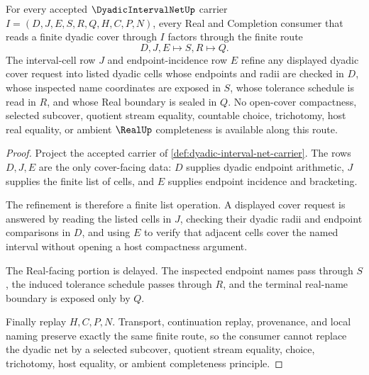 \begin{theorem}\label{thm:dyadic-interval-net-cover-refinement}
For every accepted $\DyadicIntervalNetUp$ carrier $I=(D,J,E,S,R,Q,H,C,P,N)$, every Real and Completion consumer that reads a finite dyadic cover through $I$ factors through the finite route
$$
D,J,E \longmapsto S,R \longmapsto Q .
$$
The interval-cell row $J$ and endpoint-incidence row $E$ refine any displayed dyadic cover request into listed dyadic cells whose endpoints and radii are checked in $D$, whose inspected name coordinates are exposed in $S$, whose tolerance schedule is read in $R$, and whose Real boundary is sealed in $Q$. No open-cover compactness, selected subcover, quotient stream equality, countable choice, trichotomy, host real equality, or ambient $\RealUp$ completeness is available along this route.
\end{theorem}
\begin{proof}
Project the accepted carrier of \autoref{def:dyadic-interval-net-carrier}. The rows $D,J,E$ are the only cover-facing data: $D$ supplies dyadic endpoint arithmetic, $J$ supplies the finite list of cells, and $E$ supplies endpoint incidence and bracketing.

The refinement is therefore a finite list operation. A displayed cover request is answered by reading the listed cells in $J$, checking their dyadic radii and endpoint comparisons in $D$, and using $E$ to verify that adjacent cells cover the named interval without opening a host compactness argument.

The Real-facing portion is delayed. The inspected endpoint names pass through $S$, the induced tolerance schedule passes through $R$, and the terminal real-name boundary is exposed only by $Q$.

Finally replay $H,C,P,N$. Transport, continuation replay, provenance, and local naming preserve exactly the same finite route, so the consumer cannot replace the dyadic net by a selected subcover, quotient stream equality, choice, trichotomy, host equality, or ambient completeness principle.
\end{proof}

